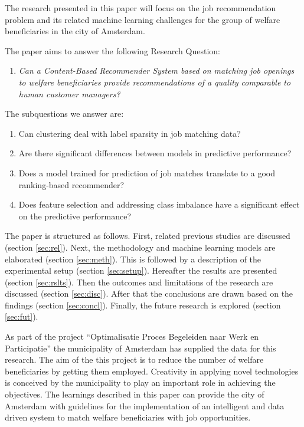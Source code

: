 The research presented in this paper will focus on the job recommendation problem and its related machine learning challenges for the group of welfare beneficiaries in the city of Amsterdam. 

The paper aims to answer the following Research Question:
\begin{enumerate}
    \item \em Can a Content-Based Recommender System based on matching job openings to welfare beneficiaries provide recommendations of a quality comparable to human customer managers? \label{rq:mrq}
\end{enumerate}{}

The subquestions we answer are:
\begin{enumerate}\addtocounter{enumi}{1}
    \item Can clustering deal with label sparsity in job matching data? \label{rq:cold}
    \item Are there significant differences between models in predictive performance? \label{rq:model}
    \item Does a model trained for prediction of job matches translate to a good ranking-based recommender? \label{rq:ranking}
    \item Does feature selection and addressing class imbalance have a significant effect on the predictive performance? \label{rq:strategies}
\end{enumerate}

The paper is structured as follows. First, related previous studies are discussed (section \ref{sec:rel}). Next, the methodology and machine learning models are elaborated (section \ref{sec:meth}). This is followed by a description of the experimental setup (section \ref{sec:setup}). Hereafter the results are presented (section \ref{sec:rslts}). Then the outcomes and limitations of the research are discussed (section \ref{sec:disc}). After that the conclusions are drawn based on the findings (section \ref{sec:concl}). Finally, the future research is explored (section \ref{sec:fut}).

As part of the project “Optimalisatie Proces Begeleiden naar Werk en Participatie” the municipality of Amsterdam has supplied the data for this research. 
The aim of the this project is to reduce the number of welfare beneficiaries by getting them employed.
Creativity in applying novel technologies is conceived by the municipality to play an important role in achieving the objectives.
The learnings described in this paper can provide the city of Amsterdam with guidelines for the implementation of an intelligent and data driven system to match welfare beneficiaries with job opportunities. 



